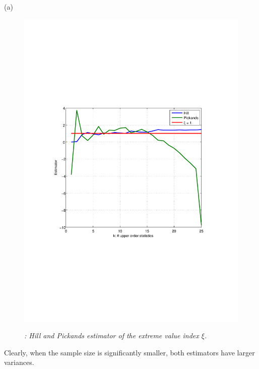 \documentclass{report}
\begin{document}
\begin{enumerate}[1.]
\begin{enumerate}{(a)}
\begin{enumerate}[(i)]
\begin{figure}[htb!]
{          \includegraphics[scale=0.35, clip=true, trim=86 232 94 186]{Hill-Pickands-100.pdf}
          \label{fig:Hill-Pickands-100}
        }
        \caption{\small \it: Hill and Pickands estimator of the extreme
          value index $\xi$.}
        \label{fig:Hill-Pickands}
      \end{figure}
      Clearly, when the sample size is significantly smaller, both
      estimators have larger variances.
    \end{enumerate}


\end{enumerate}
\end{enumerate}
\end{document}
